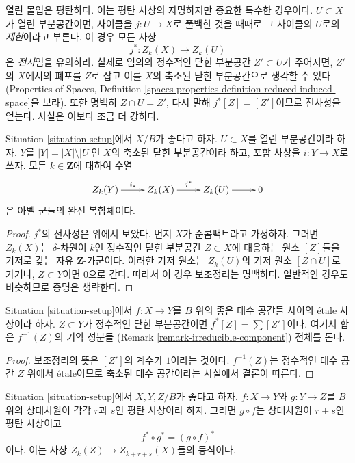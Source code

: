 \noindent
열린 몰입은 평탄하다. 이는 평탄 사상의 자명하지만 중요한 특수한 경우이다.
$U \subset X$가 열린 부분공간이면, 사이클을 $j : U \to X$로 풀백한 것을
때때로 그 사이클의 $U$로의 {\it 제한}이라고 부른다. 이 경우 모든 사상
$$
j^* : Z_k(X) \longrightarrow Z_k(U)
$$
은 {\it 전사}임을 유의하라. 실제로 임의의 정수적인 닫힌 부분공간
$Z' \subset U$가 주어지면, $Z'$의 $X$에서의 폐포를 $Z$로 잡고
이를 $X$의 축소된 닫힌 부분공간으로 생각할 수 있다(Properties of Spaces,
Definition
\ref{spaces-properties-definition-reduced-induced-space}을 보라).
또한 명백히 $Z \cap U = Z'$, 다시 말해 $j^*[Z] = [Z']$이므로
전사성을 얻는다. 사실은 이보다 조금 더 강하다.

\begin{lemma}
\label{lemma-exact-sequence-open}
Situation \ref{situation-setup}에서 $X/B$가 좋다고 하자.
$U \subset X$를 열린 부분공간이라 하자. $Y$를
$|Y| = |X| \setminus |U|$인 $X$의 축소된 닫힌 부분공간이라 하고,
포함 사상을 $i : Y \to X$로 쓰자. 모든 $k \in \mathbf{Z}$에 대하여
수열
$$
\xymatrix{
Z_k(Y) \ar[r]^{i_*} & Z_k(X) \ar[r]^{j^*} & Z_k(U) \ar[r] & 0
}
$$
은 아벨 군들의 완전 복합체이다.
\end{lemma}

\begin{proof}
$j^*$의 전사성은 위에서 보았다. 먼저 $X$가 준콤팩트라고 가정하자.
그러면 $Z_k(X)$는 $\delta$-차원이 $k$인 정수적인 닫힌 부분공간
$Z \subset X$에 대응하는 원소 $[Z]$들을 기저로 갖는 자유
$\mathbf{Z}$-가군이다. 이러한 기저 원소는 $Z_k(U)$의 기저 원소
$[Z \cap U]$로 가거나, $Z \subset Y$이면 0으로 간다.
따라서 이 경우 보조정리는 명백하다. 일반적인 경우도 비슷하므로
증명은 생략한다.
\end{proof}

\begin{lemma}
\label{lemma-etale-pullback}
Situation \ref{situation-setup}에서 $f : X \to Y$를 $B$ 위의 좋은
대수 공간들 사이의 \'etale 사상이라 하자. $Z \subset Y$가 정수적인
닫힌 부분공간이면
$f^*[Z] = \sum [Z']$이다. 여기서 합은 $f^{-1}(Z)$의 기약 성분들
(Remark \ref{remark-irreducible-component}) 전체를 돈다.
\end{lemma}

\begin{proof}
보조정리의 뜻은 $[Z']$의 계수가 $1$이라는 것이다.
$f^{-1}(Z)$는 정수적인 대수 공간 $Z$ 위에서 \'etale이므로 축소된
대수 공간이라는 사실에서 결론이 따른다.
\end{proof}

\begin{lemma}
\label{lemma-compose-flat-pullback}
Situation \ref{situation-setup}에서 $X, Y, Z/B$가 좋다고 하자.
$f : X \to Y$와 $g : Y \to Z$를 $B$ 위의 상대차원이 각각
$r$과 $s$인 평탄 사상이라 하자. 그러면 $g \circ f$는 상대차원이
$r + s$인 평탄 사상이고
$$
f^* \circ g^* = (g \circ f)^*
$$
이다. 이는 사상 $Z_k(Z) \to Z_{k + r + s}(X)$들의 등식이다.
\end{lemma}


